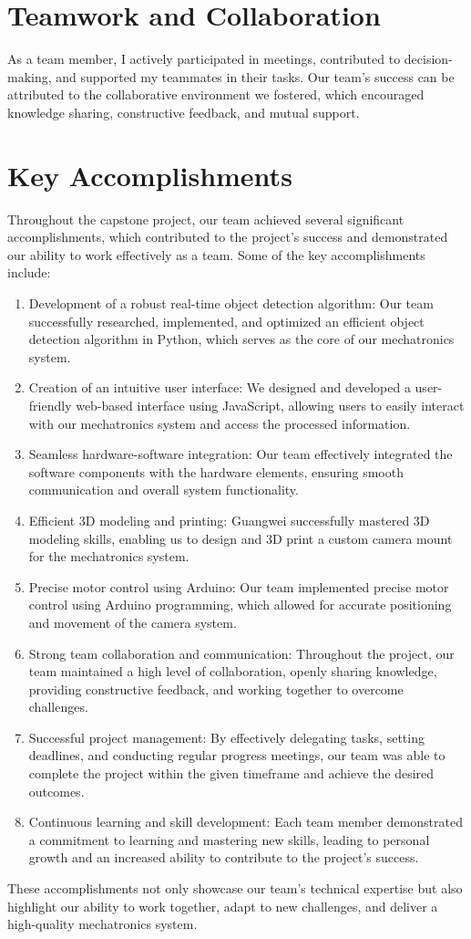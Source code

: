 \documentclass{article}
\begin{document}
\section{Teamwork and Collaboration}
As a team member, I actively participated in meetings, contributed to decision-making, and supported my teammates in their tasks. Our team's success can be attributed to the collaborative environment we fostered, which encouraged knowledge sharing, constructive feedback, and mutual support.
\section{Key Accomplishments}
Throughout the capstone project, our team achieved several significant accomplishments, which contributed to the project's success and demonstrated our ability to work effectively as a team. Some of the key accomplishments include:
\begin{enumerate}
    \item Development of a robust real-time object detection algorithm: Our team successfully researched, implemented, and optimized an efficient object detection algorithm in Python, which serves as the core of our mechatronics system.
    \item Creation of an intuitive user interface: We designed and developed a user-friendly web-based interface using JavaScript, allowing users to easily interact with our mechatronics system and access the processed information.
    \item Seamless hardware-software integration: Our team effectively integrated the software components with the hardware elements, ensuring smooth communication and overall system functionality.
    \item Efficient 3D modeling and printing: Guangwei successfully mastered 3D modeling skills, enabling us to design and 3D print a custom camera mount for the mechatronics system.
    \item Precise motor control using Arduino: Our team implemented precise motor control using Arduino programming, which allowed for accurate positioning and movement of the camera system.
    \item Strong team collaboration and communication: Throughout the project, our team maintained a high level of collaboration, openly sharing knowledge, providing constructive feedback, and working together to overcome challenges.
    \item Successful project management: By effectively delegating tasks, setting deadlines, and conducting regular progress meetings, our team was able to complete the project within the given timeframe and achieve the desired outcomes.
    \item Continuous learning and skill development: Each team member demonstrated a commitment to learning and mastering new skills, leading to personal growth and an increased ability to contribute to the project's success.
\end{enumerate}
These accomplishments not only showcase our team's technical expertise but also highlight our ability to work together, adapt to new challenges, and deliver a high-quality mechatronics system.
\end{document}
